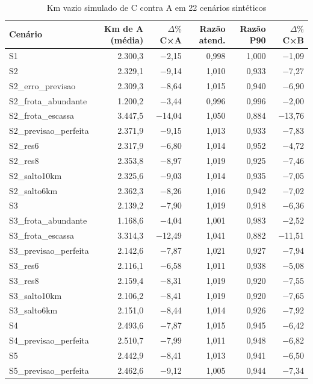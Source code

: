 \begin{table}[!htb]
\caption{Km vazio simulado de C contra A em 22 cenários sintéticos}\label{tab:sint22}
\centering\fontetabela
\begin{tabular}{@{}lrrrrr@{}}
\toprule
Cenário & Km de A (média) & $\Delta\%$ C×A & Razão atend. & Razão P90 & $\Delta\%$ C×B \\
\midrule
S1 & 2.300,3 & −2,15 & 0,998 & 1,000 & −1,09 \\
S2 & 2.329,1 & −9,14 & 1,010 & 0,933 & −7,27 \\
S2\_erro\_previsao & 2.309,3 & −8,64 & 1,015 & 0,940 & −6,90 \\
S2\_frota\_abundante & 1.200,2 & −3,44 & 0,996 & 0,996 & −2,00 \\
S2\_frota\_escassa & 3.447,5 & −14,04 & 1,050 & 0,884 & −13,76 \\
S2\_previsao\_perfeita & 2.371,9 & −9,15 & 1,013 & 0,933 & −7,83 \\
S2\_res6 & 2.317,9 & −6,80 & 1,014 & 0,952 & −4,72 \\
S2\_res8 & 2.353,8 & −8,97 & 1,019 & 0,925 & −7,46 \\
S2\_salto10km & 2.325,6 & −9,03 & 1,014 & 0,935 & −7,05 \\
S2\_salto6km & 2.362,3 & −8,26 & 1,016 & 0,942 & −7,02 \\
S3 & 2.139,2 & −7,90 & 1,019 & 0,918 & −6,36 \\
S3\_frota\_abundante & 1.168,6 & −4,04 & 1,001 & 0,983 & −2,52 \\
S3\_frota\_escassa & 3.314,3 & −12,49 & 1,041 & 0,882 & −11,51 \\
S3\_previsao\_perfeita & 2.142,6 & −7,87 & 1,021 & 0,927 & −7,94 \\
S3\_res6 & 2.116,1 & −6,58 & 1,011 & 0,938 & −5,08 \\
S3\_res8 & 2.159,4 & −8,31 & 1,019 & 0,920 & −7,55 \\
S3\_salto10km & 2.106,2 & −8,41 & 1,019 & 0,920 & −7,65 \\
S3\_salto6km & 2.151,0 & −8,44 & 1,014 & 0,926 & −7,92 \\
S4 & 2.493,6 & −7,87 & 1,015 & 0,945 & −6,42 \\
S4\_previsao\_perfeita & 2.510,7 & −7,99 & 1,011 & 0,948 & −6,82 \\
S5 & 2.442,9 & −8,41 & 1,013 & 0,941 & −6,50 \\
S5\_previsao\_perfeita & 2.462,6 & −9,12 & 1,005 & 0,944 & −7,34 \\
\bottomrule
\end{tabular}
\end{table}


